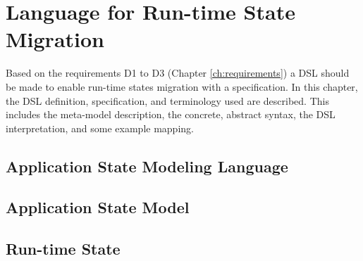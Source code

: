 \chapter{Language for Run-time State Migration}
\label{ch:language}
Based on the requirements D1 to D3 (Chapter \ref{ch:requirements}) a DSL should be made to enable run-time states migration with a specification.
In this chapter, the DSL definition, specification, and terminology used are described. This includes the meta-model description, the concrete, abstract syntax, the DSL interpretation, and some example mapping.


\section{Application State Modeling Language}


\section{Application State Model}


\section{Run-time State}
